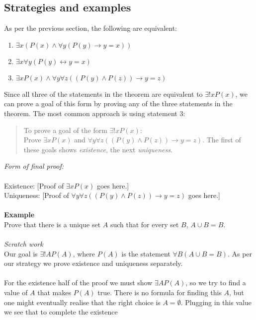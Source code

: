\documentclass{report}
\theoremstyle{definition}
\begin{document}
\subsection{Strategies and examples}
As per the previous section, the following are equivalent:
\begin{enumerate}
\item$\exists x(P(x)\land\forall y(P(y)\to y=x))$
\item$\exists x\forall y(P(y)\leftrightarrow y=x)$
\item$\exists xP(x)\land\forall y\forall z((P(y)\land P(z))\to y=z)$ 
\end{enumerate}
Since all three of the statements in the theorem are equivalent to $\exists!xP(x)$, we can prove a goal of this form by proving any of the three statements in the theorem. 
The most common approach is using statement 3:
\begin{quote}
To prove a goal of the form $\exists!xP(x)$:\\
Prove $\exists xP(x)$ and $\forall y\forall z((P(y)\land P(z))\to y=z)$. The first of these goals shows \textit{existence}, the next \textit{uniqueness}.
\end{quote}
\textit{Form of final proof:}\\
\vspace{1mm}\\
\indent Existence: [Proof of $\exists xP(x)$ goes here.]\\
\indent Uniqueness: [Proof of $\forall y\forall z((P(y)\land P(z))\to y=z)$ goes here.]\\
\vspace{1mm}\\
\textbf{Example}\\
Prove that there is a unique set $A$ such that for every set $B$, $A\cup B=B$.\\
\vspace{1mm}\\
\textit{Scratch work}\\
Our goal is $\exists!AP(A)$, where $P(A)$ is the statement $\forall B(A\cup B=B)$.
As per our strategy we prove existence and uniqueness separately.\\
\vspace{1mm}\\
For the existence half of the proof we must show $\exists AP(A)$, so we try to find a value of $A$ that makes $P(A)$ true. 
There is no formula for finding this $A$, but one might eventually realise that the right choice is $A=\emptyset$. Plugging in this value we see that to complete the existence
\end{document}
